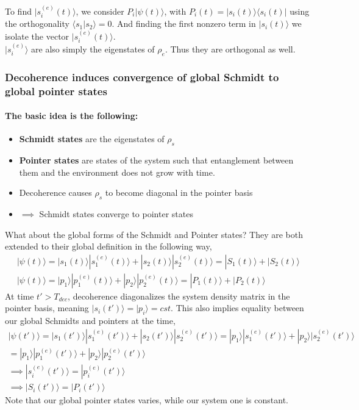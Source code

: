 \documentclass{article}
\begin{document}
To find $|s^{(e)}_i(t)\rangle$, we consider $P_i|\psi(t)\rangle$, with $P_i(t)=|s_i(t)\rangle\langle s_i(t)|$ using the orthogonality $\langle s_1|s_2 \rangle=0$. And finding the first nonzero term in $|s_i(t)\rangle$ we isolate the vector $|s^{(e)}_i(t)\rangle$. \\ 

$|s^{(e)}_i\rangle$ are also simply the eigenstates of $\rho_e$. Thus they are orthogonal as well.


\subsubsection{Decoherence induces convergence of global Schmidt to global pointer states}

\paragraph{The basic idea is the following:}

\begin{itemize}
    \item \textbf{Schmidt states} are the eigenstates of $\rho_s$
    \item \textbf{Pointer states} are states of the system such that entanglement between them and the environment does not grow with time.
    \item Decoherence causes $\rho_s$ to become diagonal in the pointer basis
    \item $\implies$ Schmidt states converge to pointer states
\end{itemize}

What about the global forms of the Schmidt and Pointer states? They are both extended to their global definition in the following way,
\begin{align}
    |\psi(t)\rangle = |s_1(t)\rangle|s_1^{(e)}(t)\rangle+|s_2(t)\rangle|s_2^{(e)}(t)\rangle = |S_1(t)\rangle+|S_2(t)\rangle\\
    |\psi(t)\rangle = |p_1\rangle|p_1^{(e)}(t)\rangle+|p_2\rangle|p_2^{(e)}(t)\rangle = |P_1(t)\rangle+|P_2(t)\rangle
\end{align}
At time $t'>T_{dec}$, decoherence diagonalizes the system density matrix in the pointer basis, meaning $|s_i(t')\rangle=|p_i\rangle=cst$. This also implies equality between our global Schmidts and pointers at the time, 
\begin{align}
    |\psi(t')\rangle = |s_1(t')\rangle|s_1^{(e)}(t')\rangle+|s_2(t')\rangle|s_2^{(e)}(t')\rangle = |p_1\rangle|s_1^{(e)}(t')\rangle+|p_2\rangle|s_2^{(e)}(t')\rangle\\
    =|p_1\rangle|p_1^{(e)}(t')\rangle+|p_2\rangle|p_2^{(e)}(t')\rangle\\
    \implies |s_i^{(e)}(t')\rangle = |p_i^{(e)}(t')\rangle\\
    \implies |S_i(t')\rangle = |P_i(t')\rangle
\end{align}
Note that our global pointer states varies, while our system one is constant. 
\end{document}
